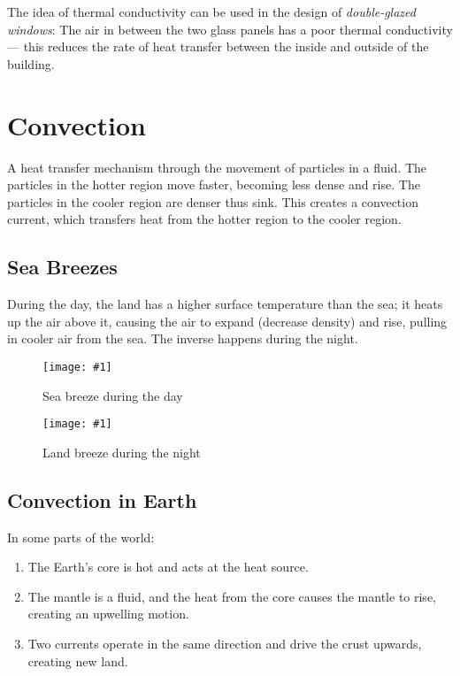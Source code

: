 \documentclass[a4paper,12pt]{article}
\let\oldsection\section
\renewcommand\section{\clearpage\oldsection}
\newcommand{\img}[4]{\begin{center}
  \begin{figure}[H]
    \centering
    \texttt{[image: \#1]}
    \caption{#3}
    \label{fig:#4}
  \end{figure}
\end{center}}
\begin{document}
The idea of thermal conductivity can be used in the design of \textit{double-glazed windows}: The air in between the two glass panels has a poor thermal conductivity --- this reduces the rate of heat transfer between the inside and outside of the building.

\section{Convection}

A heat transfer mechanism through the movement of particles in a fluid. The particles in the hotter region move faster, becoming less dense and rise. The particles in the cooler region are denser thus sink. This creates a convection current, which transfers heat from the hotter region to the cooler region.

\subsection{Sea Breezes}

During the day, the land has a higher surface temperature than the sea; it heats up the air above it, causing the air to expand (decrease density) and rise, pulling in cooler air from the sea. The inverse happens during the night.

\begin{minipage}{0.5\textwidth}
  \img{day.png}{1.0}{Sea breeze during the day}{day}
\end{minipage}%
\begin{minipage}{0.5\textwidth}
  \img{night.png}{1.0}{Land breeze during the night}{night}
\end{minipage}%

\pagebreak

\subsection{Convection in Earth}

In some parts of the world:
\begin{enumerate}
  \item The Earth's core is hot and acts at the heat source.
  \item The mantle is a fluid, and the heat from the core causes the mantle to rise, creating an upwelling motion.
  \item Two currents operate in the same direction and drive the crust upwards, creating new land.
\end{enumerate}
\end{document}
